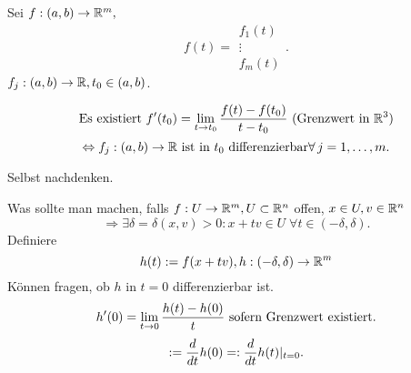 \documentclass[../ana2.tex]{subfiles}
\begin{document}
\begin{lem}
    Sei \( f:(a,b)\rightarrow \mathbb{R}^m, \) 
    \[f(t) = \begin{array}{c}
        f_1(t)\\
        \vdots \\
        f_m(t)
    \end{array}. \]
    \( f_j:(a,b)\rightarrow \mathbb{R}, t_0 \in (a,b) \).

    \[ \text{Es existiert } f'(t_0) = \lim\limits_{t\rightarrow{}t_0} \frac{f(t) - f(t_0)}{t - t_0} 
    \text{ (Grenzwert in \( \mathbb{R}^3 \))} \]
    \[ \Leftrightarrow \abb{f_j}{(a,b)}{\R} 
    \text{ ist in \(t_0\) differenzierbar} \forall j=1,\ldots,m. \]
\end{lem}
\begin{bew}
    Selbst nachdenken.
\end{bew}
Was sollte man machen, falls \( f:U\rightarrow \mathbb{R}^m, 
U \subset \mathbb{R}^n \) offen, \( x\in U, v \in \mathbb{R}^n \)
\[ \Rightarrow \exists \delta = \delta(x,v) > 0: 
x + tv \in U \;\forall t \in (-\delta, \delta). \]
Definiere 
\[ h(t) := f(x + tv), h:(-\delta,\delta)\rightarrow \mathbb{R}^m \]
Können fragen, ob \( h \) in 
\( t = 0 \) differenzierbar ist.
\[ h'(0) = \lim\limits_{t\rightarrow{}0} \frac{h(t) - h(0)}{t} \text{ sofern 
Grenzwert existiert.} \]
\[ := \frac{d}{dt} h(0) =: \frac{d}{dt} h(t)\vert_{t=0}. \]
\end{document}
